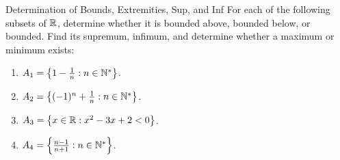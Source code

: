 \begin{exercise}{Determination of Bounds, Extremities, Sup, and Inf}
For each of the following subsets of $\mathbb{R}$, determine whether it is bounded above, bounded below, or bounded. Find its supremum, infimum, and determine whether a maximum or minimum exists:
\begin{enumerate}[leftmargin=1.5em,itemsep=2pt]
  \item $A_1 = \left\{ 1 - \frac{1}{n} : n \in \mathbb{N}^* \right\}$.
  \item $A_2 = \left\{ (-1)^n + \frac{1}{n} : n \in \mathbb{N}^* \right\}$.
  \item $A_3 = \left\{ x \in \mathbb{R} : x^2 - 3x + 2 < 0 \right\}$.
  \item $A_4 = \left\{ \frac{n - 1}{n + 1} : n \in \mathbb{N}^* \right\}$.
\end{enumerate}
\end{exercise}

\begin{tabletworkspace}[5.0cm]
\end{tabletworkspace}

